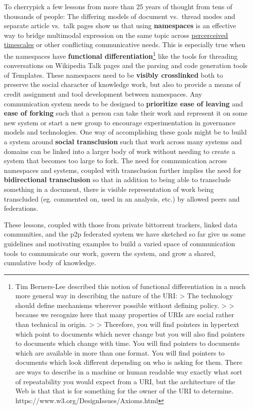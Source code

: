 \documentclass[10pt]{article}
\begin{document}
\begin{multicols}{2}
To cherrypick a few lessons from more than 25 years of thought from tens
of thousands of people: The differing models of document vs.~thread
modes and separate article vs.~talk pages show us that using
\textbf{namespaces} is an effective way to bridge multimodal expression
on the same topic across
\href{https://communitywiki.org/wiki/TimeInWikis}{percerceived
timescales} or other conflicting communicative needs. This is especially
true when the namespaces have \textbf{functional
differentiation}\footnote{Tim Berners-Lee described this notion of
  functional differentiation in a much more general way in describing
  the nature of the URI: \textgreater{} The technology should define
  mechanisms wherever possible without defining policy. \textgreater{}
  \textgreater{} because we recognize here that many properties of URIs
  are social rather than technical in origin. \textgreater{}
  \textgreater{} Therefore, you will find pointers in hypertext which
  point to documents which never change but you will also find pointers
  to documents which change with time. You will find pointers to
  documents which are available in more than one format. You will find
  pointers to documents which look different depending on who is asking
  for them. There are ways to describe in a machine or human readable
  way exactly what sort of repeatability you would expect from a URI,
  but the architecture of the Web is that that is for something for the
  owner of the URI to determine.
  https://www.w3.org/DesignIssues/Axioms.html} like the tools for
threading conversations on Wikipedia Talk pages and the parsing and code
generation tools of Templates. These namespaces need to be
\textbf{visibly crosslinked} both to preserve the social character of
knowledge work, but also to provide a means of credit assignment and
tool development between namespaces. Any communication system needs to
be designed to \textbf{prioritize ease of leaving} and \textbf{ease of
forking} such that a person can take their work and represent it on some
new system or start a new group to encourage experimentation in
governance models and technologies. One way of accomplishing these goals
might be to build a system around \textbf{social transclusion} such that
work across many systems and domains can be linked into a larger body of
work without needing to create a system that becomes too large to fork.
The need for communication across namespaces and systems, coupled with
transclusion further implies the need for \textbf{bidirectional
transclusion} so that in addition to being able to transclude something
in a document, there is visible representation of work being transcluded
(eg. commented on, used in an analysis, etc.) by allowed peers and
federations.

These lessons, coupled with those from private bittorrent trackers,
linked data communities, and the p2p federated system we have sketched
so far give us some guidelines and motivating examples to build a varied
space of communication tools to communicate our work, govern the system,
and grow a shared, cumulative body of knowledge.


\end{multicols}
\end{document}
